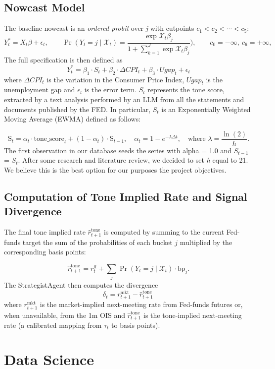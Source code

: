 \subsection{Nowcast Model}
The baseline nowcast is an \emph{ordered probit} over \emph{j} with cutpoints $c_1 < c_2 < \cdots < c_5$:
\[
  Y^*_t = X_t \beta + \epsilon_t,\qquad \Pr(Y_{t} = j \mid \mathcal{X}_t) = \frac{\exp{\mathcal{X}_t}\beta_j}{1+\sum_{k=1}^J\exp{\mathcal{X}_t\beta_j}}),\qquad c_0 = -\infty,\ c_6 = +\infty,
\]
The full specification is then defined as
\[
  Y^*_t = \beta_1 \cdot S_t + \beta_2 \cdot \Delta CPI_t + \beta_3 \cdot Ugap_t + \epsilon_t
\]
where $\Delta CPI_t$ is the variation in the Consumer Price Index, $Ugap_t$ is the unemployment gap and $\epsilon_t$ is the error term. $S_t$ represents the tone score, extracted by a text analysis performed by an LLM from all the statements and documents published by the FED. In particular, $S_t$ is an Exponentially Weighted Moving Average (EWMA) defined as follows:

\[
  \text{S}_t = \alpha_t \cdot \text{tone\_score}_t + (1 - \alpha_t) \cdot \text{S}_{t-1},\quad \alpha_t = 1 - e^{-\lambda \Delta t}, \quad \text{where } \lambda = \frac{\ln(2)}{h}.
\]
The first observation in our database seeds the series with alpha = 1.0 and $S_{t-1}$ =  $S_t$. After some research and literature review, we decided to set \emph{h} equal to 21. We believe this is the best option for our purposes the project objectives.

\subsection{Computation of Tone Implied Rate and Signal Divergence}
The final tone implied rate $\widehat{r}^{\text{tone}}_{t+1}$ is computed by summing to the current Fed-funds target the sum of the probabilities of each bucket $j$ multiplied by the corresponding basis points:

\[
  \widehat{r}^{\text{tone}}_{t+1} = r_t^{\text{ff}} + \sum_{j} \Pr(Y_{t} = j \mid \mathcal{X}_t) \cdot \text{bp}_j.
\]
The StrategistAgent then computes the divergence
\[
  \delta_t = r^{\text{mkt}}_{t+1} - \widehat{r}^{\text{tone}}_{t+1}\,
\]
where $r^{\text{mkt}}_{t+1}$ is the market-implied next-meeting rate from Fed-funds futures or, when unavailable, from the 1m OIS and $\widehat{r}^{\text{tone}}_{t+1}$ is the tone-implied next-meeting rate (a calibrated mapping from $\tau_t$ to basis points).

\section{Data Science}

